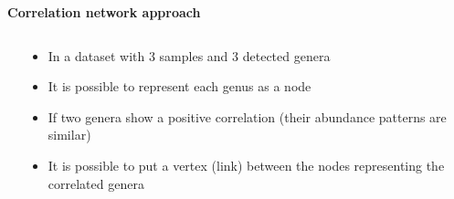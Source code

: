 \documentclass[10pt]{beamer}
\begin{document}
\begin{frame}
	\vspace{2mm}
	\textbf{\Large{Correlation network approach}}
	\vspace{1mm}
	\pause
	\begin{columns}
		\begin{column}{0.5\textwidth}
			\begin{overlayarea}{\textwidth}{0.8\textheight}
				\begin{center}
				
				
				
				\end{center}
			\end{overlayarea}
		\end{column}
		\begin{column}{0.5\textwidth}
			\begin{overlayarea}{\textwidth}{0.8\textheight}
				\begin{itemize}
					\vspace{8mm}
					\item<2-> In a dataset with 3 samples and 3 detected genera
					\item<3-> It is possible to represent each genus as a node
					\item<4-> If two genera show a positive correlation (their abundance patterns are similar)
					\item<5-> It is possible to put a vertex (link) between the nodes representing the correlated genera	
				\end{itemize}
			\end{overlayarea}
		\end{column}
	\end{columns}
\end{frame}
\end{document}
